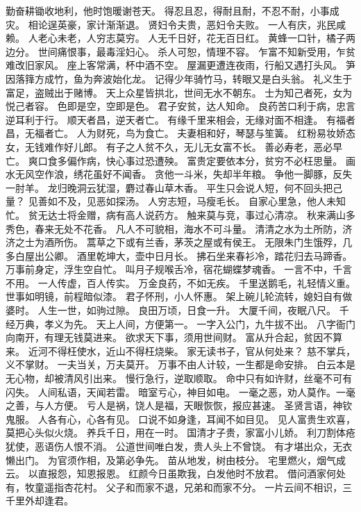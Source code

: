 \documentclass[12pt,UTF8]{ctexbook}
\begin{document}
勤奋耕锄收地利，他时饱暖谢苍天。
得忍且忍，得耐且耐，不忍不耐，小事成灾。
相论逞英豪，家计渐渐退。
贤妇令夫贵，恶妇令夫败。
一人有庆，兆民咸赖。
人老心未老，人穷志莫穷。
人无千日好，花无百日红。
黄蜂一口针，橘子两边分。
世间痛恨事，最毒淫妇心。
杀人可恕，情理不容。
乍富不知新受用，乍贫难改旧家风。
座上客常满，杯中酒不空。
屋漏更遭连夜雨，行船又遇打头风。
笋因落箨方成竹，鱼为奔波始化龙。
记得少年骑竹马，转眼又是白头翁。
礼义生于富足，盗贼出于赌博。
天上众星皆拱北，世间无水不朝东。
士为知己者死，女为悦己者容。
色即是空，空即是色。
君子安贫，达人知命。
良药苦口利于病，忠言逆耳利于行。
顺天者昌，逆天者亡。
有缘千里来相会，无缘对面不相逢。
有福者昌，无福者亡。
人为财死，鸟为食亡。
夫妻相和好，琴瑟与笙簧。
红粉易妆娇态女，无钱难作好儿郎。
有子之人贫不久，无儿无女富不长。
善必寿老，恶必早亡。
爽口食多偏作病，快心事过恐遭殃。
富贵定要依本分，贫穷不必枉思量。
画水无风空作浪，绣花虽好不闻香。
贪他一斗米，失却半年粮。
争他一脚豚，反失一肘羊。
龙归晚洞云犹湿，麝过春山草木香。
平生只会说人短，何不回头把己量？
见善如不及，见恶如探汤。
人穷志短，马瘦毛长。
自家心里急，他人未知忙。
贫无达士将金赠，病有高人说药方。
触来莫与竞，事过心清凉。
秋来满山多秀色，春来无处不花香。
凡人不可貌相，海水不可斗量。
清清之水为土所防，济济之士为酒所伤。
蒿草之下或有兰香，茅茨之屋或有侯王。
无限朱门生饿殍，几多白屋出公卿。
酒里乾坤大，壶中日月长。
拂石坐来春衫冷，踏花归去马蹄香。
万事前身定，浮生空自忙。
叫月子规喉舌冷，宿花蝴蝶梦魂香。
一言不中，千言不用。
一人传虚，百人传实。
万金良药，不如无疾。
千里送鹅毛，礼轻情义重。
世事如明镜，前程暗似漆。
君子怀刑，小人怀惠。
架上碗儿轮流转，媳妇自有做婆时。
人生一世，如驹过隙。
良田万顷，日食一升。
大厦千间，夜眠八尺。
千经万典，孝义为先。
天上人间，方便第一。
一字入公门，九牛拔不出。
八字衙门向南开，有理无钱莫进来。
欲求天下事，须用世间财。
富从升合起，贫因不算来。
近河不得枉使水，近山不得枉烧柴。
家无读书子，官从何处来？
慈不掌兵，义不掌财。
一夫当关，万夫莫开。
万事不由人计较，一生都是命安排。
白云本是无心物，却被清风引出来。
慢行急行，逆取顺取。
命中只有如许财，丝毫不可有闪失。
人间私语，天闻若雷。
暗室亏心，神目如电。
一毫之恶，劝人莫作。一毫之善，与人方便。
亏人是祸，饶人是福，天眼恢恢，报应甚速。
圣贤言语，神钦鬼服。
人各有心，心各有见。
口说不如身逢，耳闻不如目见。
见人富贵生欢喜，莫把心头似火烧。
养兵千日，用在一时。
国清才子贵，家富小儿娇。
利刀割体疮犹使，恶语伤人恨不消。
公道世间唯白发，贵人头上不曾饶。
有才堪出众，无衣懒出门。
为官须作相，及第必争先。
苗从地发，树由枝分。
宅里燃火，烟气成云。
以直报怨，知恩报恩。
红颜今日虽欺我，白发他时不放君。
借问酒家何处有，牧童遥指杏花村。
父子和而家不退，兄弟和而家不分。
一片云间不相识，三千里外却逢君。
\end{document}
